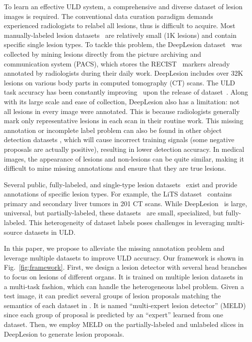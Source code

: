 \documentclass[runningheads]{llncs}
\def\Fig#1{{Fig.~\ref{fig:#1}}}
\begin{document}
To learn an effective ULD system, a comprehensive and diverse dataset of lesion images is required. The conventional data curation paradigm demands experienced radiologists to relabel all lesions, thus is difficult to acquire. Most manually-labeled lesion datasets~\cite{Setio2017LUNA,Bilic2019LiTS,NIH_LN_dataset} are relatively small (1K lesions) and contain specific single lesion types. To tackle this problem, the DeepLesion dataset~\cite{Yan2018graph,Yan2018DeepLesion} was collected by mining lesions directly from the picture archiving and communication system (PACS), which stores the RECIST~\cite{Eisenhauer2009RECIST} markers already annotated by radiologists during their daily work. DeepLesion includes over 32K lesions on various body parts in computed tomography (CT) scans. The ULD task accuracy has been constantly improving~\cite{Wang2019universal,Yan20183DCE,Zlocha2019retina,Li2019MVP,Wang2019LiTS,Yan2019MULAN} upon the release of dataset~\cite{Yan2018DeepLesion}. Along with its large scale and ease of collection, DeepLesion also has a limitation: not all lesions in every image were annotated. This is because radiologists generally mark only representative lesions in each scan \cite{Eisenhauer2009RECIST} in their routine work. This missing annotation or incomplete label problem can also be found in other object detection datasets \cite{Niitani2019sample,Wu2019soft}, which will cause incorrect training signals (some negative proposals are actually positive), resulting in lower detection accuracy. In medical images, the appearance of lesions and non-lesions can be quite similar, making it difficult to mine missing annotations and ensure that they are true lesions.

Several public, fully-labeled, and single-type lesion datasets~\cite{Setio2017LUNA,Bilic2019LiTS,NIH_LN_dataset} exist and provide annotations of specific lesion types. For example, the LiTS dataset~\cite{Bilic2019LiTS} contains primary and secondary liver tumors in 201 CT scans. While DeepLesion~\cite{Yan2018DeepLesion} is large, universal, but partially-labeled, these datasets~\cite{Setio2017LUNA,Bilic2019LiTS,NIH_LN_dataset} are small, specialized, but fully-labeled. This heterogeneity of dataset labels poses challenges in leveraging multi-source datasets in ULD.

In this paper, we propose to alleviate the missing annotation problem and leverage multiple datasets to improve ULD accuracy. Our framework is shown in \Fig{framework}. First, we design a lesion detector with several head branches to focus on lesions of different organs. It is trained on multiple lesion datasets in a multi-task fashion, which can handle the heterogeneous label problem. Given a test image, it can predict several groups of lesion proposals matching the semantics of each dataset in \cite{Yan2018DeepLesion,Setio2017LUNA,Bilic2019LiTS,NIH_LN_dataset}. It is named ``multi-expert lesion detector'' (MELD) since each group of proposal is predicted by an ``expert'' learned from one dataset. Then, we employ MELD on the partially-labeled and unlabeled slices in DeepLesion to generate lesion proposals.
\end{document}
